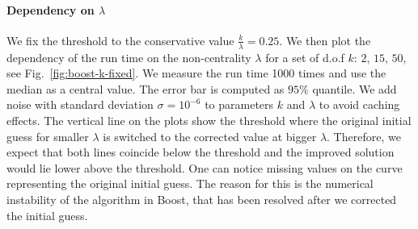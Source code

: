 \documentclass[final,5p,twocolumn,times,authoryear]{elsarticle}
\begin{document}
\paragraph{Dependency on $\lambda$} We fix the threshold to the conservative value  $\frac{k}{\lambda} = 0.25$. We then plot the dependency of the run time on the non-centrality $\lambda$ for a set of d.o.f $k$: $2$, $15$, $50$, see Fig.~\ref{fig:boost-k-fixed}. We measure the run time 1000 times and use the median as a central value. The error bar is computed as $95\%$ quantile. We add noise with standard deviation $\sigma = 10^{-6}$ to parameters $k$ and $\lambda$ to avoid caching effects. The vertical line on the plots show the threshold where the original initial guess for smaller $\lambda$ is switched to the corrected value at bigger $\lambda$. Therefore, we expect that both lines coincide below the threshold and the improved solution would lie lower above the threshold. One can notice missing values on the curve representing the original initial guess. The reason for this is the numerical instability of the algorithm in Boost, that has been resolved after we corrected the initial guess.
%
\end{document}
